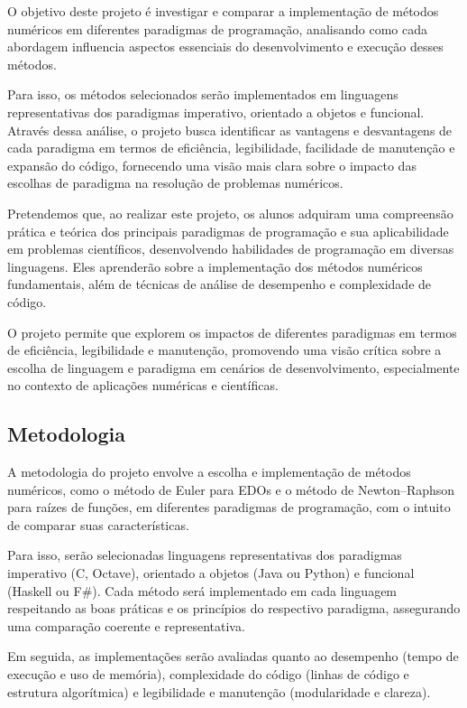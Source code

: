 O objetivo deste projeto é investigar e comparar a implementação de métodos
numéricos em diferentes paradigmas de programação, analisando como cada
abordagem influencia aspectos essenciais do desenvolvimento e execução desses
métodos.

Para isso, os métodos selecionados serão implementados em linguagens
representativas dos paradigmas imperativo, orientado a objetos e funcional.
Através dessa análise, o projeto busca identificar as vantagens e desvantagens
de cada paradigma em termos de eficiência, legibilidade, facilidade de
manutenção e expansão do código, fornecendo uma visão mais clara sobre o
impacto das escolhas de paradigma na resolução de problemas numéricos.

Pretendemos que, ao realizar este projeto, os alunos adquiram uma compreensão
prática e teórica dos principais paradigmas de programação e sua aplicabilidade
em problemas científicos, desenvolvendo habilidades de programação em diversas
linguagens. Eles aprenderão sobre a implementação dos métodos numéricos
fundamentais, além de técnicas de análise de desempenho e complexidade de
código.

O projeto permite que explorem os impactos de diferentes paradigmas em termos
de eficiência, legibilidade e manutenção, promovendo uma visão crítica sobre a
escolha de linguagem e paradigma em cenários de desenvolvimento, especialmente
no contexto de aplicações numéricas e científicas.

\subsection*{Metodologia}

A metodologia do projeto envolve a escolha e implementação de métodos
numéricos, como o método de Euler para EDOs e o método de Newton--Raphson para
raízes de funções, em diferentes paradigmas de programação, com o intuito de
comparar suas características.

Para isso, serão selecionadas linguagens representativas dos paradigmas
imperativo (C, Octave), orientado a objetos (Java ou Python) e funcional
(Haskell ou F\#). Cada método será implementado em cada linguagem respeitando
as boas práticas e os princípios do respectivo paradigma, assegurando uma
comparação coerente e representativa.

Em seguida, as implementações serão avaliadas quanto ao desempenho
(tempo de execução e uso de memória), complexidade do código
(linhas de código e estrutura algorítmica) e legibilidade e manutenção
(modularidade e clareza).


